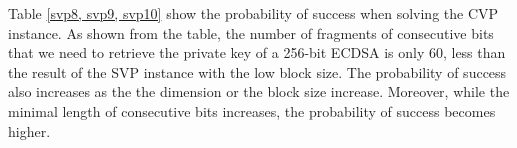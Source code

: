 
Table \ref{svp8, svp9, svp10} show the probability of success when solving the CVP instance.
As shown from the table,
  the number of fragments of consecutive bits that we need to retrieve the private key of a 256-bit ECDSA is only $60$, less than the result of the SVP instance with the low block size.
 The probability of success also increases as the the dimension or the block size increase.
Moreover, while the minimal length of consecutive bits increases, the probability of success becomes higher.




